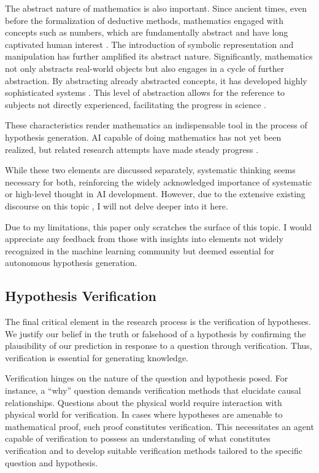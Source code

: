 The abstract nature of mathematics is also important. Since ancient times, even before the formalization of deductive methods, mathematics engaged with concepts such as numbers, which are fundamentally abstract and have long captivated human interest \cite{david2010history}. The introduction of symbolic representation and manipulation has further amplified its abstract nature. Significantly, mathematics not only abstracts real-world objects but also engages in a cycle of further abstraction. By abstracting already abstracted concepts, it has developed highly sophisticated systems \cite{bochner1968role}. This level of abstraction allows for the reference to subjects not directly experienced, facilitating the progress in science \cite{heisenberg2008abstraction}. 

These characteristics render mathematics an indispensable tool in the process of hypothesis generation. AI capable of doing mathematics has not yet been realized, but related research attempts have made steady progress \cite{rabe2021towards,imani2023mathprompter}.

While these two elements are discussed separately, systematic thinking seems necessary for both, reinforcing the widely acknowledged importance of systematic or high-level thought in AI development. However, due to the extensive existing discourse on this topic \cite{goyal2022inductive}, I will not delve deeper into it here.

Due to my limitations, this paper only scratches the surface of this topic. I would appreciate any feedback from those with insights into elements not widely recognized in the machine learning community but deemed essential for autonomous hypothesis generation.

\subsection{Hypothesis Verification}
The final critical element in the research process is the verification of hypotheses. We justify our belief in the truth or falsehood of a hypothesis by confirming the plausibility of our prediction in response to a question through verification. Thus, verification is essential for generating knowledge.

Verification hinges on the nature of the question and hypothesis posed. For instance, a ``why'' question demands verification methods that elucidate causal relationships. Questions about the physical world require interaction with physical world for verification. In cases where hypotheses are amenable to mathematical proof, such proof constitutes verification. This necessitates an agent capable of verification to possess an understanding of what constitutes verification and to develop suitable verification methods tailored to the specific question and hypothesis.


